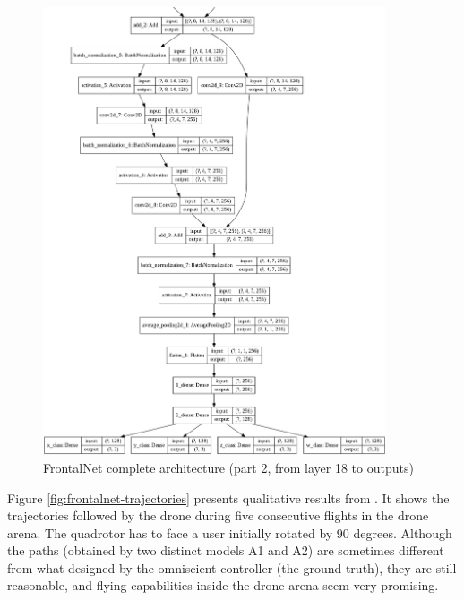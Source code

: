 \begin{figure}[!h]
	\centering
	\includegraphics[width=0.9\textwidth]{"contents/images/03-frontalnet-3B"}
	\caption[FrontalNet complete architecture (part 2, from layer 18 to outputs)]{FrontalNet complete architecture (part 2, from layer 18 to outputs)}
	\label{fig:frontalnet-architecture-3b}
\end{figure}

\clearpage

Figure \ref{fig:frontalnet-trajectories} presents qualitative results from \cite{mantegazza2019visionbased}. It shows the trajectories followed by the drone during five consecutive flights in the drone arena. The quadrotor has to face a user initially rotated by 90 degrees. Although the paths (obtained by two distinct models A1 and A2) are sometimes different from what designed by the omniscient controller (the ground truth), they are still reasonable, and flying capabilities inside the drone arena seem very promising.

